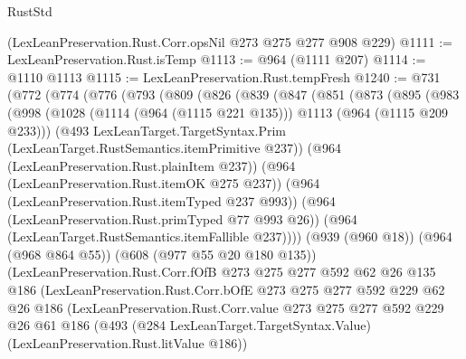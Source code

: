 \begin{lexlean}{RustStd}
\begin{coremodule}
    (LexLeanPreservation.Rust.Corr.opsNil @273 @275 @277 @908 @229)
@1111 := LexLeanPreservation.Rust.isTemp
@1113 := @964 (@1111 @207)
@1114 := @1110 @1113
@1115 := LexLeanPreservation.Rust.tempFresh
@1240 := @731
    (@772
      (@774
        (@776
          (@793
            (@809
              (@826
                (@839
                  (@847
                    (@851
                      (@873
                        (@895
                          (@983
                            (@998
                              (@1028
                                (@1114 (@964 (@1115 @221 @135)))
                                @1113
                                (@964 (@1115 @209 @233)))
                              (@493
                                LexLeanTarget.TargetSyntax.Prim
                                (LexLeanTarget.RustSemantics.itemPrimitive @237))
                              (@964 (LexLeanPreservation.Rust.plainItem @237))
                              (@964 (LexLeanPreservation.Rust.itemOK @275 @237))
                              (@964 (LexLeanPreservation.Rust.itemTyped @237 @993))
                              (@964 (LexLeanPreservation.Rust.primTyped @77 @993 @26))
                              (@964 (LexLeanTarget.RustSemantics.itemFallible @237))))
                          (@939 (@960 @18))
                          (@964 (@968 @864 @55))
                          (@608 (@977 @55 @20 @180 @135))
                          (LexLeanPreservation.Rust.Corr.fOfB
                            @273
                            @275
                            @277
                            @592
                            @62
                            @26
                            @135
                            @186
                            (LexLeanPreservation.Rust.Corr.bOfE
                              @273
                              @275
                              @277
                              @592
                              @229
                              @62
                              @26
                              @186
                              (LexLeanPreservation.Rust.Corr.value
                                @273
                                @275
                                @277
                                @592
                                @229
                                @26
                                @61
                                @186
                                (@493
                                  (@284 LexLeanTarget.TargetSyntax.Value)
                                  (LexLeanPreservation.Rust.litValue @186))

\end{coremodule}
\end{lexlean}
